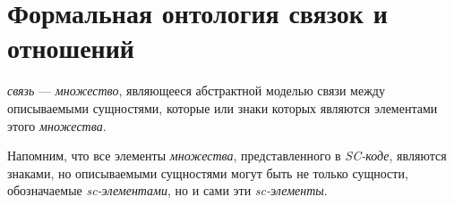 \begin{comment}
\textbf{\textit{мощность множества}} --- это \textit{параметр}, элементами которых являются \textit{множества}, имеющие одинаковое количество элементов. Значением данного параметра является числовая величина, задающая количество элементов, входящих в данный класс множеств, то есть по сути, количество \textit{позитивных sc-дуг принадлежности}, выходящих из данного \textit{множества}.
	
Для двух множеств, имеющих одинаковую мощность, существует взаимно-однозначное соответствие между ними (между множествами вхождений элементов в эти множества --- на случай мультимножеств).
\end{comment}

\section{Формальная онтология связок и отношений}
\label{sec_top_ontologies_rel}

\textit{связь} --- \textit{множество}, являющееся абстрактной моделью связи между описываемыми сущностями, которые или знаки которых являются элементами этого \textit{множества}.

Напомним, что все элементы \textit{множества}, представленного в \textit{SC-коде}, являются знаками, но описываемыми сущностями могут быть не только сущности, обозначаемые \textit{sc-элементами}, но и сами эти \textit{sc-элементы}.

\begin{SCn}
\begin{scnsubdividing}
\end{scnsubdividing}

\begin{scnsubdividing}
\end{scnsubdividing}
\end{SCn}
	
